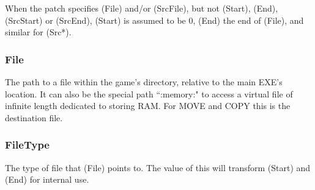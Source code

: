 \documentclass[12pt,a4paper,notitlepage]{article}
\begin{document}
When the patch specifies (File) and/or (SrcFile), but not (Start), (End), (SrcStart) or (SrcEnd), (Start) is assumed to be 0, (End) the end of (File), and similar for (Src*).


\subsubsection{File}
The path to a file within the game's directory, relative to the main EXE's location. It can also be the special path ``:memory:" to access a virtual file of infinite length dedicated to storing RAM. For MOVE and COPY this is the destination file.

\subsubsection{FileType}
The type of file that (File) points to. The value of this will transform (Start) and (End) for internal use.
\end{document}
